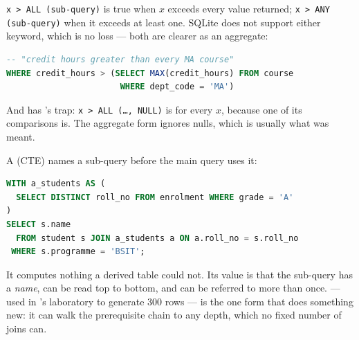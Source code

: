 \begin{examplebox}
\texttt{x > ALL (sub-query)} is true when $x$ exceeds every value returned;
\texttt{x > ANY (sub-query)} when it exceeds at least one. SQLite does not
support either keyword, which is no loss --- both are clearer as an aggregate:

\begin{lstlisting}[language=sql]
-- "credit hours greater than every MA course"
WHERE credit_hours > (SELECT MAX(credit_hours) FROM course
                       WHERE dept_code = 'MA')
\end{lstlisting}

\smallskip
And  has 's trap: \texttt{x > ALL (\dots, NULL)} is
\unk{} for every $x$, because one of its comparisons is. The
aggregate form ignores nulls, which is usually what was meant.
\end{examplebox}

\begin{definitionbox}
A  (CTE) names a sub-query before the main query
uses it:

\begin{lstlisting}[language=sql]
WITH a_students AS (
  SELECT DISTINCT roll_no FROM enrolment WHERE grade = 'A'
)
SELECT s.name
  FROM student s JOIN a_students a ON a.roll_no = s.roll_no
 WHERE s.programme = 'BSIT';
\end{lstlisting}

\smallskip
It computes nothing a derived table could not. Its value is that the
sub-query has a \emph{name}, can be read top to bottom, and can be referred to
more than once.  --- used in 's
laboratory to generate 300 rows --- is the one form that does something new:
it can walk the prerequisite chain to any depth, which no fixed number of joins
can.
\end{definitionbox}

